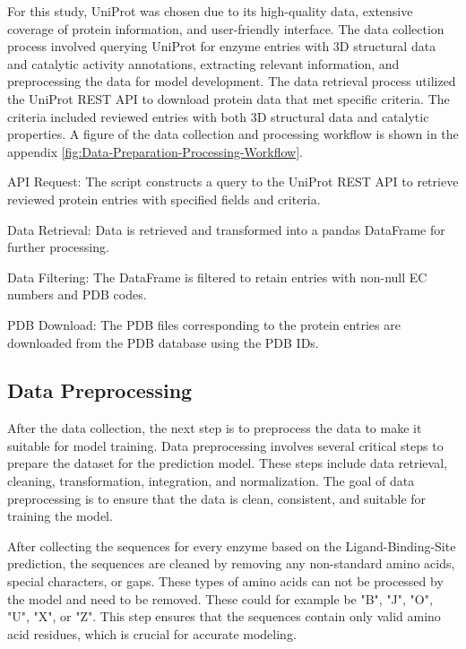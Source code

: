 For this study, UniProt was chosen due to its high-quality data, extensive coverage of protein information, and user-friendly interface. The data collection process involved querying UniProt for enzyme entries with 3D structural data and catalytic activity annotations, extracting relevant information, and preprocessing the data for model development. The data retrieval process utilized the UniProt REST API to download protein data that met specific criteria. The criteria included reviewed entries with both 3D structural data and catalytic properties. A figure of the data collection and processing workflow is shown in the appendix \ref{fig:Data-Preparation-Processing-Workflow}.

\begin{compactenum}
    \item API Request: The script constructs a query to the UniProt REST API to retrieve reviewed protein entries with specified fields and criteria.
    \item Data Retrieval: Data is retrieved and transformed into a pandas DataFrame for further processing.
    \item Data Filtering: The DataFrame is filtered to retain entries with non-null EC numbers and PDB codes.
    \item PDB Download: The PDB files corresponding to the protein entries are downloaded from the PDB database using the PDB IDs.
\end{compactenum}

\subsection{Data Preprocessing}
\label{sec:Data Preprocessing}

After the data collection, the next step is to preprocess the data to make it suitable for model training. Data preprocessing involves several critical steps to prepare the dataset for the prediction model. These steps include data retrieval, cleaning, transformation, integration, and normalization. The goal of data preprocessing is to ensure that the data is clean, consistent, and suitable for training the model.

After collecting the sequences for every enzyme based on the Ligand-Binding-Site prediction, the sequences are cleaned by removing any non-standard amino acids, special characters, or gaps. These types of amino acids can not be processed by the model and need to be removed. These could for example be "B", "J", "O", "U", "X", or "Z".  This step ensures that the sequences contain only valid amino acid residues, which is crucial for accurate modeling. \autocite{OneletterNotationAmino1972}

